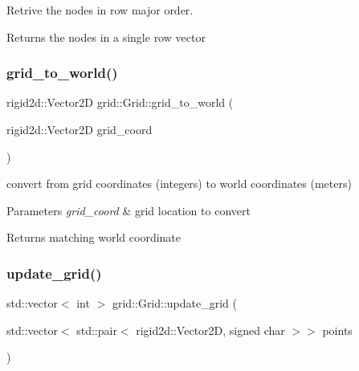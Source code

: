 Retrive the nodes in row major order. 

\begin{DoxyReturn}{Returns}
the nodes in a single row vector 
\end{DoxyReturn}
\mbox{\label{classgrid_1_1Grid_a740d72189efbdf5595c3ddaacc8cdfc4}} 
\subsubsection{\texorpdfstring{grid\+\_\+to\+\_\+world()}{grid\_to\_world()}}
{\footnotesize\ttfamily rigid2d\+::\+Vector2D grid\+::\+Grid\+::grid\+\_\+to\+\_\+world (\begin{DoxyParamCaption}\item[{rigid2d\+::\+Vector2D}]{grid\+\_\+coord }\end{DoxyParamCaption})}



convert from grid coordinates (integers) to world coordinates (meters) 


\begin{DoxyParams}{Parameters}
{\em grid\+\_\+coord} & grid location to convert \\
\hline
\end{DoxyParams}
\begin{DoxyReturn}{Returns}
matching world coordinate 
\end{DoxyReturn}
\mbox{\label{classgrid_1_1Grid_adc9dda8d5d6bca20697790712b154cc1}} 
\subsubsection{\texorpdfstring{update\+\_\+grid()}{update\_grid()}}
{\footnotesize\ttfamily std\+::vector$<$ int $>$ grid\+::\+Grid\+::update\+\_\+grid (\begin{DoxyParamCaption}\item[{std\+::vector$<$ std\+::pair$<$ rigid2d\+::\+Vector2D, signed char $>$$>$}]{points }\end{DoxyParamCaption})}



